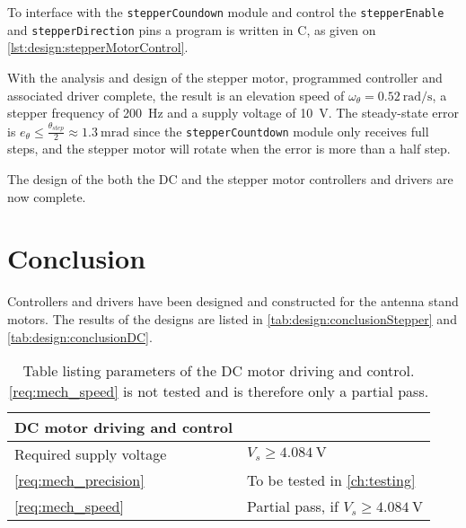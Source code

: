 To interface with the \texttt{stepperCoundown} module and control the \texttt{stepperEnable} and \texttt{stepperDirection} pins a program is written in C, as given on \autoref{lst:design:stepperMotorControl}.

\begin{figure} [h!]
	
\end{figure}

\newpage
With the analysis and design of the stepper motor, programmed controller and associated driver complete, the result is an elevation speed of $\omega_\theta =\SI{0.52}{\radian\per\second}$, a stepper frequency of \SI{200}{\hertz} and a supply voltage of \SI{10}{\volt}. The steady-state error is $e_\theta \leq \frac{\theta_{step}}{2}\approx\SI{1.3}{\milli\radian}$ since the \texttt{stepperCountdown} module only receives full steps, and the stepper motor will rotate when the error is more than a half step. 

The design of the both the DC and the stepper motor controllers and drivers are now complete.

\section{Conclusion}
Controllers and drivers have been designed and constructed for the antenna stand motors. The results of the designs are listed in \autoref{tab:design:conclusionStepper} and \autoref{tab:design:conclusionDC}.

\begin{table}[h]
	\centering
	\caption{Table listing parameters of the DC motor driving and control. \autoref{req:mech_speed} is not tested and is therefore only a partial pass.} \label{tab:design:conclusionDC}
	\begin{tabularx}{\textwidth}{lX}
		\textbf{DC motor driving and control}   &   \\ \toprule \rowcolor{lightGrey}
		Required supply voltage         		&   $V_s \geq \SI{4.084}{\volt}$ \\
		\autoref{req:mech_precision}    		&   To be tested in \autoref{ch:testing} \\ \rowcolor{lightGrey}
		\autoref{req:mech_speed}    			&   Partial pass, if $V_s \geq \SI{4.084}{\volt}$ \\
	\end{tabularx}
\end{table}

